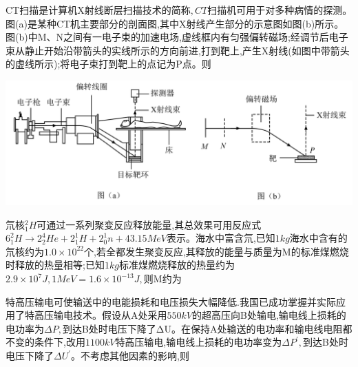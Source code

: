 \begin{solution}{4cm}

\end{solution}



\question[6]CT扫描是计算机X射线断层扫描技术的简称$,CT$扫描机可用于对多种病情的探测。图(a)是某种CT机主要部分的剖面图,其中X射线产生部分的示意图如图(b)所示。图(b)中M、N之间有一电子束的加速电场,虚线框内有匀强偏转磁场;经调节后电子束从静止开始沿带箭头的实线所示的方向前进,打到靶上,产生X射线(如图中带箭头的虚线所示);将电子束打到靶上的点记为P点。则
\begin{center}
\includegraphics[]{img/image3.png}
\end{center}

\begin{solution}{4cm}

\end{solution}



\question[6]氘核$_1^2H$可通过一系列聚变反应释放能量,其总效果可用反应式$6_1^2H→2_2^4He+2_1^1H+2_0^1n+43.15MeV$表示。海水中富含氘,已知$1kg$海水中含有的氘核约为$1.0×10^{22}$个,若全都发生聚变反应,其释放的能量与质量为M的标准煤燃烧时释放的热量相等;已知$1kg$标准煤燃烧释放的热量约为$2.9×10^7J,1MeV=1.6×10^{-13}J,$则M约为
\begin{solution}{4cm}

\end{solution}



\question[6]特高压输电可使输送中的电能损耗和电压损失大幅降低.我国已成功掌握并实际应用了特高压输电技术。假设从A处采用$550kV$的超高压向B处输电,输电线上损耗的电功率为$ΔP,$到达B处时电压下降了ΔU。在保持A处输送的电功率和输电线电阻都不变的条件下,改用$1100kV$特高压输电,输电线上损耗的电功率变为$ΔP^\prime,$到达B处时电压下降了$ΔU^\prime$。不考虑其他因素的影响,则
\begin{solution}{4cm}

\end{solution}



